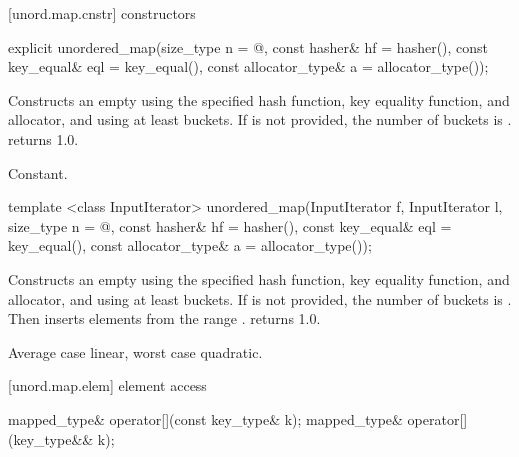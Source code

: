 [unord.map.cnstr]{ constructors}

%
\begin{itemdecl}
explicit unordered_map(size_type n = @\seebelow@,
                       const hasher& hf = hasher(),
                       const key_equal& eql = key_equal(),
                       const allocator_type& a = allocator_type());
\end{itemdecl}

\begin{itemdescr}
\pnum
\effects Constructs an empty  using the
specified hash function, key equality function, and allocator, and
using at least \textit{} buckets.  If \textit{} is not
provided, the number of buckets is .
 returns 1.0.

\pnum
\complexity Constant.
\end{itemdescr}

%
\begin{itemdecl}
template <class InputIterator>
  unordered_map(InputIterator f, InputIterator l,
                size_type n = @\seebelow@,
                const hasher& hf = hasher(),
                const key_equal& eql = key_equal(),
                const allocator_type& a = allocator_type());
\end{itemdecl}

\begin{itemdescr}
\pnum
\effects Constructs an empty  using the
specified hash function, key equality function, and allocator, and
using at least \textit{} buckets. If \textit{} is not
provided, the number of buckets is . Then
inserts elements from the range \tcode{[\textit{f}, \textit{l})}.
 returns 1.0.

\pnum
\complexity Average case linear, worst case quadratic.
\end{itemdescr}

[unord.map.elem]{ element access}

%
%
%
\begin{itemdecl}
mapped_type& operator[](const key_type& k);
mapped_type& operator[](key_type&& k);
\end{itemdecl}

